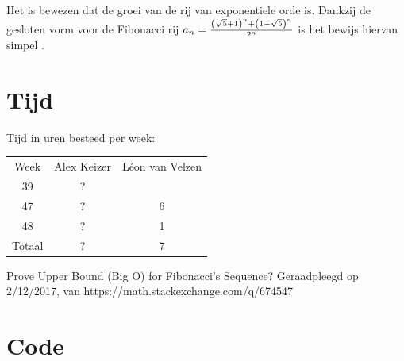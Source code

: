 \documentclass[13pt]{article}
\begin{document}
Het is bewezen dat de groei van de rij van exponentiele orde is. Dankzij de gesloten vorm voor de Fibonacci rij $a_n={{\left(\sqrt{5}+1\right)^{n}+\left(1-\sqrt{5}\right)^{n}}\over{2^{n}}}$ is het bewijs hiervan simpel \cite{proof}.

\section{Tijd}

Tijd in uren besteed per week:

\begin{center}
\begin{tabular}{ |c|c|c| }
\hline
Week & Alex Keizer & L\'{e}on van Velzen \\
39 & ? &  \\
47 & ? & 6 \\
48 & ? & 1 \\ 
\hline
Totaal & ? & 7 \\
\hline
\end{tabular}
\end{center}

\begin{thebibliography}{9}
     Prove Upper Bound (Big O) for Fibonacci's Sequence? Geraadpleegd op 2/12/2017, van https://math.stackexchange.com/q/674547
\end{thebibliography}

\section{Code}


\end{document}
